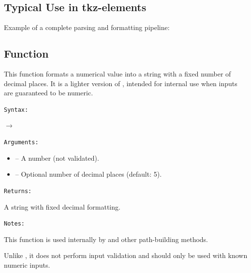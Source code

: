 \subsection{Typical Use in tkz-elements}

Example of a complete parsing and formatting pipeline:

\begin{tkzexample}[latex=.4\textwidth]
\end{tkzexample}



\subsection{Function }
\label{sub:function_utils_format_coord}

This function formats a numerical value into a string with a fixed number of decimal places. It is a lighter version of , intended for internal use when inputs are guaranteed to be numeric.

\texttt{Syntax: }

\begin{center}
 \hfill $\rightarrow$ 
\end{center}

\texttt{Arguments: }

\begin{itemize}
\item {} – A number (not validated).
\item {} – Optional number of decimal places (default: 5).
\end{itemize}

\medskip
\texttt{Returns: }

A string with fixed decimal formatting.

\medskip
\texttt{Notes: }

This function is used internally by  and other path-building methods.

Unlike , it does not perform input validation and should only be used with known numeric inputs.

